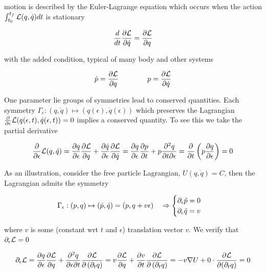 \documentclass[12pt]{article}
\begin{document}
motion is described by the Euler-Lagrange equation which occurs when the action $\int_{t_0}^{t_f} \mathcal L(q,\dot q) dt$ is stationary

\begin{equation}\label{eq:euler lagrange}
    \frac{d}{dt}\frac{\partial \mathcal L}{\partial \dot q} = \frac{\partial \mathcal L}{\partial q}
\end{equation}

with the added condition, typical of many body and other systems

\begin{equation}\label{eq:lagrangian added conditions}
    \dot p = \frac{\partial \mathcal L}{\partial q} \qquad\qquad p = \frac{\partial \mathcal L}{\partial \dot q}
\end{equation}

One parameter lie groups of symmetries lead to conserved quantities. Each symmetry $\Gamma_\epsilon : (q,\dot q)\mapsto (q(\epsilon),\dot q(\epsilon))$ which preserves the Lagrangian $\frac{\partial}{\partial\epsilon}\mathcal L(q(\epsilon,t),\dot q(\epsilon,t)) = 0$ implies a conserved quantity. To see this we take the partial derivative

\begin{equation}\label{eq:noether's theorem 1 derivation}
\frac{\partial }{\partial \epsilon} \mathcal L(q,\dot q) = \frac{\partial q}{\partial \epsilon} \frac{\partial \mathcal L}{\partial q} + \frac{\partial \dot q}{\partial \epsilon}\frac{\partial \mathcal L}{\partial \dot q} = \frac{\partial q}{\partial \epsilon}\frac{\partial p}{\partial t} + p \frac{\partial^2 q}{\partial t \partial \epsilon} = \frac{\partial }{\partial t}\left( p \frac{\partial q}{\partial \epsilon} \right) = 0
\end{equation}

 As an illustration, consider the free particle Lagrangian, $U(q,\dot q) = C$, then the Lagrangian admits the symmetry

$$\Gamma_\epsilon : (p,q)\mapsto (\hat p,\hat q) = (p,q + v\epsilon) \quad \Rightarrow \begin{cases} \partial_\epsilon \hat p = 0\\ \partial_\epsilon \hat q = v \end{cases}$$

where $v$ is some (constant wrt $t$ and $\epsilon$) translation vector $v$. We verify that $\partial_\epsilon \mathcal L = 0$

$$\partial_\epsilon \mathcal L = \frac{\partial q}{\partial \epsilon}\frac{\partial \mathcal L}{\partial q} + \frac{\partial^2 q}{\partial \epsilon\partial t}\frac{\partial \mathcal L}{\partial \left( \partial_t q \right)} = v\frac{\partial \mathcal L}{\partial q} + \frac{\partial v}{\partial t}\frac{\partial \mathcal L}{\partial \left(\partial_t q\right)} = -v\nabla U + 0\cdot \frac{\partial \mathcal L}{\partial (\partial_t q)} = 0$$
\end{document}
